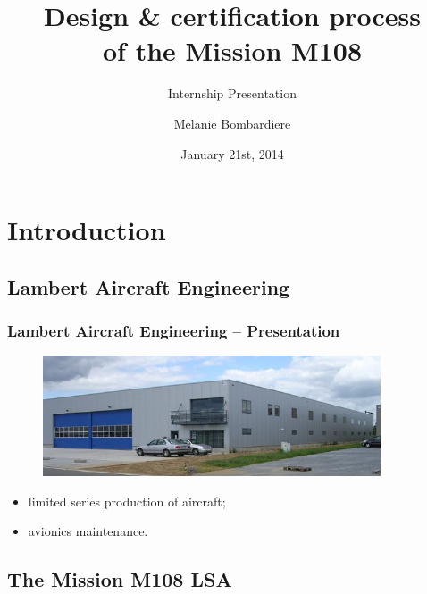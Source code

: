 \documentclass{beamer}
\begin{document}
\subtitle{Internship Presentation}

\title{Design \& certification process\\ of the Mission M108}

\author{Melanie Bombardiere}

\date{January 21st, 2014}

\begin{frame}
  \titlepage
\end{frame}

\section{Introduction}

\subsection{Lambert Aircraft Engineering}

\begin{frame}\frametitle{Lambert Aircraft Engineering -- Presentation}
\begin{figure}[ht!]
	\begin{center}
		\includegraphics[width=10cm]{pics/PIC001.jpg}
		\label{fig:LAE}
	\end{center}
\end{figure}

\begin{itemize}
    \item limited series production of aircraft;
    \item avionics maintenance.
  \end{itemize}
\end{frame}

\subsection{The Mission M108 LSA}
\end{document}

